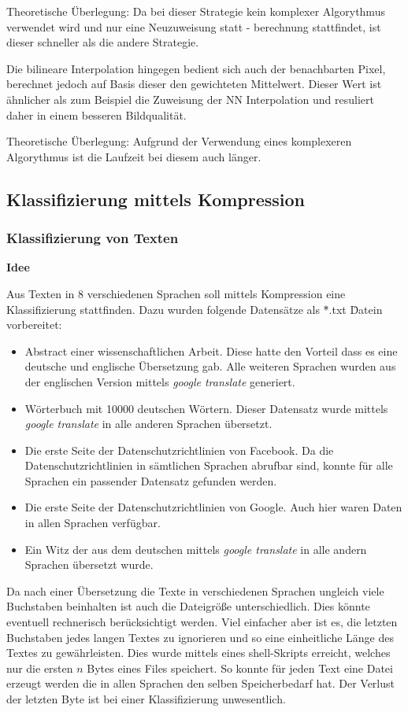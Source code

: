 \documentclass[12pt,german]{article}
\begin{document}
Theoretische Überlegung: Da bei dieser Strategie kein komplexer Algorythmus verwendet wird und nur eine Neuzuweisung statt - berechnung stattfindet, ist dieser schneller als die andere Strategie.

Die bilineare Interpolation hingegen bedient sich auch der benachbarten Pixel, berechnet jedoch auf Basis dieser den gewichteten Mittelwert. Dieser Wert ist ähnlicher als zum Beispiel die Zuweisung der NN Interpolation und resuliert daher in einem besseren Bildqualität. 

Theoretische Überlegung: Aufgrund der Verwendung eines komplexeren Algorythmus ist die Laufzeit bei diesem auch länger.

 \subsection{Klassifizierung mittels Kompression}
\subsubsection{Klassifizierung von Texten}

\textbf{Idee}

Aus Texten in 8 verschiedenen Sprachen soll mittels Kompression eine Klassifizierung stattfinden. Dazu wurden folgende Datensätze als \" *.txt \" Datein vorbereitet:

\begin{itemize}
	\item Abstract einer wissenschaftlichen Arbeit. Diese hatte den Vorteil dass es eine deutsche und englische Übersetzung gab. Alle weiteren Sprachen wurden aus der englischen Version mittels \textit{google translate} generiert.
	\item Wörterbuch mit 10000 deutschen Wörtern. Dieser Datensatz wurde mittels \textit{google translate} in alle anderen Sprachen übersetzt.
	\item Die erste Seite der Datenschutzrichtlinien von Facebook. Da die Datenschutzrichtlinien in sämtlichen Sprachen abrufbar sind, konnte für alle Sprachen ein passender Datensatz gefunden werden.
	\item Die erste Seite der Datenschutzrichtlinien von Google. Auch hier waren Daten in allen Sprachen verfügbar.
	\item Ein Witz der aus dem deutschen mittels \textit{google translate} in alle andern Sprachen übersetzt wurde.
\end{itemize}

Da nach einer Übersetzung die Texte in verschiedenen Sprachen ungleich viele Buchstaben beinhalten ist auch die Dateigröße unterschiedlich. Dies könnte eventuell rechnerisch berücksichtigt werden. Viel einfacher aber ist es, die letzten Buchstaben jedes langen Textes zu ignorieren und so eine einheitliche Länge des Textes zu gewährleisten. Dies wurde mittels eines shell-Skripts erreicht, welches nur die ersten $n$ Bytes eines Files speichert. So konnte für jeden Text eine Datei erzeugt werden die in allen Sprachen den selben Speicherbedarf hat. Der Verlust der letzten Byte ist bei einer Klassifizierung unwesentlich. 
\end{document}
